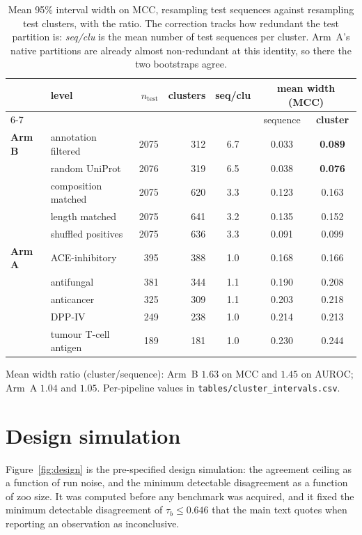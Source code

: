 \documentclass[11pt,a4paper]{article}
\begin{document}
\begin{table}[htbp]\centering\small
\caption{Mean 95\% interval width on MCC, resampling test sequences against resampling test
clusters, with the ratio. The correction tracks how redundant the test partition is:
\emph{seq/clu} is the mean number of test sequences per cluster. Arm~A's native partitions
are already almost non-redundant at this identity, so there the two bootstraps agree.}
\label{tab:clusterci}
\begin{tabular}{llrrccc}
\toprule
 & level & $n_\text{test}$ & clusters & seq/clu & \multicolumn{2}{c}{mean width (MCC)} \\
\cmidrule(lr){6-7}
 & & & & & sequence & \textbf{cluster} \\
\midrule
\textbf{Arm B} & annotation filtered & 2075 & 312 & 6.7 & 0.033 & \textbf{0.089} \\
 & random UniProt      & 2076 & 319 & 6.5 & 0.038 & \textbf{0.076} \\
 & composition matched & 2075 & 620 & 3.3 & 0.123 & 0.163 \\
 & length matched      & 2075 & 641 & 3.2 & 0.135 & 0.152 \\
 & shuffled positives  & 2075 & 636 & 3.3 & 0.091 & 0.099 \\
\addlinespace
\textbf{Arm A} & ACE-inhibitory & 395 & 388 & 1.0 & 0.168 & 0.166 \\
 & antifungal            & 381 & 344 & 1.1 & 0.190 & 0.208 \\
 & anticancer            & 325 & 309 & 1.1 & 0.203 & 0.218 \\
 & DPP-IV                & 249 & 238 & 1.0 & 0.214 & 0.213 \\
 & tumour T-cell antigen & 189 & 181 & 1.0 & 0.230 & 0.244 \\
\bottomrule
\end{tabular}

\vspace{3pt}
\footnotesize\raggedright
Mean width ratio (cluster/sequence): Arm~B $1.63$ on MCC and $1.45$ on AUROC; Arm~A $1.04$
and $1.05$. Per-pipeline values in \texttt{tables/cluster\_intervals.csv}.
\end{table}

\section{Design simulation}

Figure~\ref{fig:design} is the pre-specified design simulation: the agreement
ceiling as a function of run noise, and the minimum detectable disagreement as a
function of zoo size. It was computed before any benchmark was acquired, and it
fixed the minimum detectable disagreement of $\tau_b \leq 0.646$ that the main
text quotes when reporting an observation as inconclusive.
\end{document}
